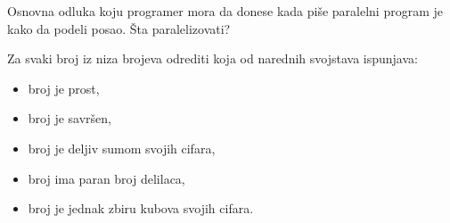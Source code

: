 \documentclass[../main.tex]{subfiles}
\begin{document}
Osnovna odluka koju programer mora da donese kada piše paralelni program je kako da podeli posao. Šta paralelizovati?
\begin{boxprimer}
Za svaki broj iz niza brojeva odrediti koja od narednih svojstava ispunjava:
\begin{multicols}{2}
\begin{itemize}
\item broj je prost,
\item broj je savršen,
\item broj je deljiv sumom svojih cifara,
\columnbreak
\item broj ima paran broj delilaca,
\item broj je jednak zbiru kubova svojih cifara.
\end{itemize}
\end{multicols}
\end{boxprimer}
\end{document}

